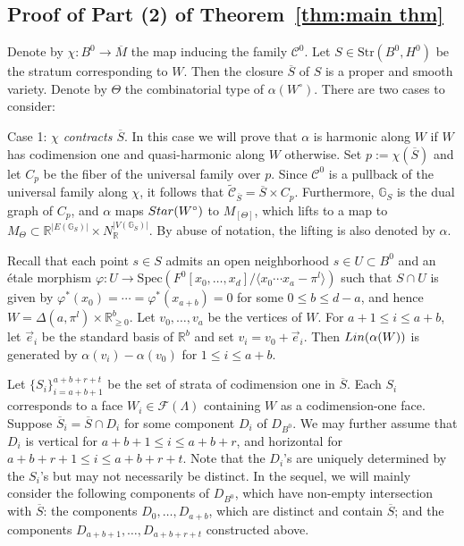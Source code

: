\documentclass[11pt,reqno]{amsart}
\numberwithin{equation}{section}
\theoremstyle{definition}
\newcommand{\Lin}{{\rm Lin}}
\newcommand{\RR}{{\mathbb R}}
\newcommand{\GG}{{\mathbb G}}
\newcommand{\Star}{{\rm Star}}
\newcommand{\cC}{{\mathcal{C}}}
\theoremstyle{remark}
\begin{document}
\subsection{Proof of Part (2) of Theorem~\ref{thm:main thm}} 
Denote by $\chi\colon B^0\rightarrow \overline M$ the map inducing the family $\cC^0$. Let $S\in \mathrm{Str}(B^0,H^0)$ be the stratum corresponding to $W$. Then the closure $\overline S$ of $S$
is a proper and smooth variety. Denote by $\Theta$ the combinatorial type of $\alpha(W^\circ)$. There are two cases to consider:

Case 1: \textit{$\chi$ contracts $\overline S$}. In this case we will prove that $\alpha$ is harmonic along $W$ if $W$ has codimension one and quasi-harmonic along $W$ otherwise.  Set $p:=\chi(\overline S)$ and let $C_p$ be the fiber of the universal family over $p$. Since $\cC^0$ is a pullback of the universal family along $\chi$, it follows that $\widetilde \cC_{\overline S}=\overline S\times C_p$. Furthermore, $\GG_S$ is the dual graph of $C_p$, and $\alpha$ maps $\Star(W^\circ)$ to $M_{[\Theta]}$, which lifts to a map to $M_\Theta\subset \RR^{|E(\GG_S)|} \times N_\RR^{|V(\GG_S)|}$. By abuse of notation, the lifting is also denoted by $\alpha$. 

Recall that each point $s\in S$ admits an open neighborhood $s\in U\subset B^0$ and an \'etale morphism
$\varphi\colon U\rightarrow \mathrm{Spec}\left(F^0[x_0,\dotsc,x_d]/\langle x_0\cdots x_a-\pi^l\rangle\right)$ such that $S\cap U$ is given by $\varphi^*(x_0)=\cdots=\varphi^*(x_{a+b})=0$ for some $0\le b\leq d-a$, and hence
$W=\Delta(a,\pi^l)\times \mathbb R^b_{\geq 0}$. Let $v_0,\dotsc,v_a$ be the vertices of $W$. For $a+1\leq i\leq a+b$, let $\vec e_i$ be the standard basis of $\mathbb R^b$ and set $v_i=v_0+\vec e_i$. Then $\Lin(\alpha(W))$ is generated by $\alpha(v_i)-\alpha(v_0)$ for $1\leq i\leq a+b$.

Let $\{S_i\}_{i=a+b+1}^{a+b+r+t}$ be the set of strata of codimension one in $\overline S$. Each $S_i$ corresponds to a face $W_i\in\mathcal F(\Lambda)$ containing $W$ as a codimension-one face. Suppose $\overline S_i=\overline S\cap D_i$ for some component $D_i$ of $D_{B^0}$. We may further assume that $D_i$ is vertical for $a+b+1\leq i\leq a+b+r$, and horizontal for $a+b+r+1\leq i\leq a+b+r+t$. Note that the $D_i$'s are uniquely determined by the $S_i$'s but may not necessarily be distinct. In the sequel, we will mainly consider the following components of $D_{B^0}$, which have non-empty intersection with $\overline S$: the components $D_0,\dotsc,D_{a+b}$, which are distinct and contain $\overline S$; and the components $D_{a+b+1},\dotsc,D_{a+b+r+t}$ constructed above. 
\end{document}
